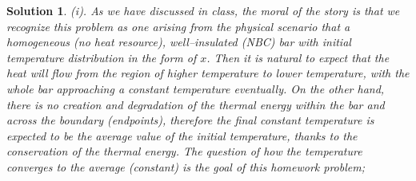 \documentclass[6pt]{article}
\newtheorem{solution}{Solution}
\numberwithin{equation}{section}
\begin{document}
\begin{enumerate}
\begin{solution}
(i).  As we have discussed in class, the moral of the story is that we recognize this problem as one arising from the physical scenario that a homogeneous (no heat resource), well--insulated (NBC) bar with initial temperature distribution in the form of $x$.  Then it is natural to expect that the heat will flow from the region of higher temperature to lower temperature, with the whole bar approaching a constant temperature eventually.  On the other hand, there is no creation and degradation of the thermal energy within the bar and across the boundary (endpoints), therefore the final constant temperature is expected to be the average value of the initial temperature, thanks to the conservation of the thermal energy.  The question of how the temperature converges to the average (constant) is the goal of this homework problem;


\end{solution}
\end{enumerate}
\end{document}
